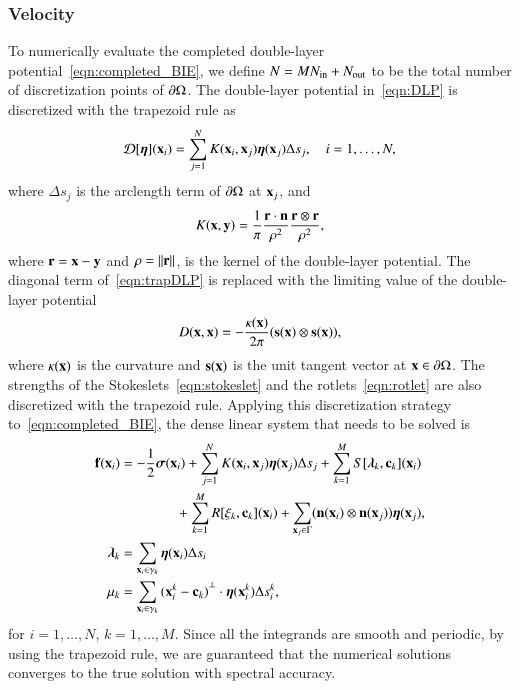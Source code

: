 \documentclass[preprint, 10pt]{elsarticle}
\begin{document}
\subsubsection{Velocity}
To numerically evaluate the completed double-layer
potential~\eqref{eqn:completed_BIE}, we define $N = MN_{\mathrm{in}} + N_{\mathrm{out}}$ to
be the total number of discretization points of ${\partial}\Omega$.  The
double-layer potential in~\eqref{eqn:DLP} is discretized with the
trapezoid rule as
\begin{align}
  {\mathcal{D}}[{\boldsymbol\eta}]({\mathbf{x}}_i) = \sum_{j=1}^{N} K({\mathbf{x}}_i,{\mathbf{x}}_j) {\boldsymbol\eta}({\mathbf{x}}_j) 
      \Delta s_{j}, \quad i=1,\ldots,N,
  \label{eqn:trapDLP}
\end{align}
where $\Delta s_j$ is the arclength term of ${\partial}\Omega$ at
${\mathbf{x}}_j$, and
\begin{align*}
  K({\mathbf{x}},{\mathbf{y}}) = \frac{1}{\pi} \frac{{\mathbf{r}} \cdot {\mathbf{n}}}{\rho^2} 
      \frac{{\mathbf{r}} \otimes {\mathbf{r}}}{\rho^2},
\end{align*}
where ${\mathbf{r}} = {\mathbf{x}} - {\mathbf{y}}$ and $\rho = \|{\mathbf{r}}\|$, is the kernel of the
double-layer potential.  The diagonal term of~\eqref{eqn:trapDLP} is
replaced with the limiting value of the double-layer potential
\begin{align*}
  D({\mathbf{x}},{\mathbf{x}}) = -\frac{\kappa({\mathbf{x}})}{2\pi}({\mathbf{s}}({\mathbf{x}}) \otimes {\mathbf{s}}({\mathbf{x}})),
\end{align*}
where $\kappa({\mathbf{x}})$ is the curvature and ${\mathbf{s}}({\mathbf{x}})$ is the unit tangent
vector at ${\mathbf{x}} \in {\partial}\Omega$.  The strengths of the
Stokeslets~\eqref{eqn:stokeslet} and the rotlets~\eqref{eqn:rotlet} are
also discretized with the trapezoid rule.  Applying this discretization
strategy to~\eqref{eqn:completed_BIE}, the dense linear system that
needs to be solved is
\begin{equation}
  \label{eqn:completed_BIE_discretized}
  \begin{aligned}
    {\mathbf{f}}({\mathbf{x}}_i) &= -\frac{1}{2}{\boldsymbol\sigma}({\mathbf{x}}_i) + \sum_{j=1}^{N} 
      K({\mathbf{x}}_i,{\mathbf{x}}_j) {\boldsymbol\eta}({\mathbf{x}}_j) \Delta s_{j} + 
      \sum_{k=1}^M S[{\boldsymbol\lambda}_k,{\mathbf{c}}_k]({\mathbf{x}}_i) \\
      &\hspace{40pt}
      +\sum_{k=1}^M R[\xi_k,{\mathbf{c}}_k]({\mathbf{x}}_i) 
      +\sum_{{\mathbf{x}}_j \in \Gamma} ({\mathbf{n}}({\mathbf{x}}_i) \otimes
      {\mathbf{n}}({\mathbf{x}}_j)){\boldsymbol\eta}({\mathbf{x}}_j), \\
    {\boldsymbol\lambda}_k &= \sum_{{\mathbf{x}}_i \in \gamma_k} {\boldsymbol\eta}({\mathbf{x}}_i) 
      \Delta s_i \\ 
    \mu_k &= \sum_{{\mathbf{x}}_i \in \gamma_k}
      {({\mathbf{x}}_i^k - {\mathbf{c}}_k)}^\perp \cdot {\boldsymbol\eta}({\mathbf{x}}_i^k) \Delta s_i^k,
  \end{aligned}
\end{equation}
for $i=1,\ldots,N$, $k=1,\ldots,M$.  Since all the integrands are smooth
and periodic, by using the trapezoid rule, we are guaranteed that the
numerical solutions converges to the true solution with spectral
accuracy.
\end{document}
